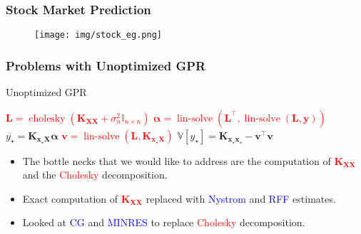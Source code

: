\documentclass[9pt,hyperref={pdfpagelabels=false},xcolor=table]{beamer}
\begin{document}
\begin{frame}
    \frametitle{Stock Market Prediction}

    \begin{figure}
        \centering
        \begin{adjustbox}{width=0.9\textwidth}
            \texttt{[image: img/stock\_eg.png]}
        \end{adjustbox}
    \end{figure}
\end{frame}

\begin{frame}
    \frametitle{Problems with Unoptimized GPR}
    {\centering
        \begin{minipage}{.9\linewidth}
            \begin{algorithm}[H]
                \caption{Unoptimized GPR}
                \SetAlgoLined
                \DontPrintSemicolon

                \BlankLine
                \textcolor{red}{$\bm{L} = \operatorname{cholesky} \left( \bm{K_{XX}} + \sigma_n^2 \mathbb{I}_{n \times n} \right)$}\;
                \textcolor{red}{$\bm{\alpha} = \operatorname{lin-solve} \left( \bm{L}^{\intercal} , \operatorname{lin-solve} \left( \bm{L}, \bm{y} \right) \right)$}\;
                $\overline{y_{\star}} = \bm{K_{x_{\star} X}} \bm{\alpha}$\;
                \textcolor{red}{$\bm{v} = \operatorname{lin-solve} \left( \bm{L}, \bm{K_{x_{\star} X}} \right)$}\;
                $\mathbb{V} \left[ y_{\star} \right] = \bm{K_{x_{\star} x_{\star}}} - \bm{v}^{\intercal} \bm{v}$\;
                \BlankLine
            \end{algorithm}
        \end{minipage}
        \par
    }
\end{frame}

\begin{frame}
    \begin{itemize}
        \item The bottle necks that we would like to address are the computation of \textcolor{red}{$\bm{K_{X X}}$} and the \textcolor{red}{Cholesky} decomposition.
              \pause
              \bigskip
        \item Exact computation of \textcolor{red}{$\bm{K_{X X}}$} replaced with \textcolor{blue}{Nystrom} and \textcolor{blue}{RFF} estimates.
              \pause
              \bigskip
        \item Looked at \textcolor{blue}{CG} and \textcolor{blue}{MINRES} to replace \textcolor{red}{Cholesky} decomposition.
    \end{itemize}
\end{frame}
\end{document}
